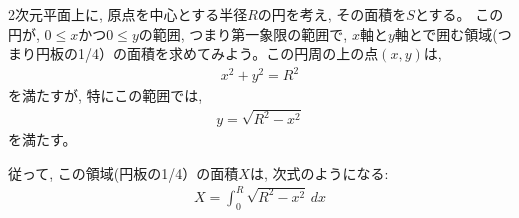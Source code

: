 \begin{exmpl}\label{exmpl:surface2volume_sphere0}
2次元平面上に, 原点を中心とする半径$R$の円を考え, その面積を$S$とする。
この円が, $0\leq x$かつ$0\leq y$の範囲, つまり第一象限の範囲で, 
$x$軸と$y$軸とで囲む領域(つまり円板の1/4）の面積を求めてみよう。この円周の上の点$(x, y)$は,
\begin{eqnarray}x^2+y^2=R^2\end{eqnarray} 
を満たすが, 特にこの範囲では, 
\begin{eqnarray}y=\sqrt{R^2-x^2}\label{eq:circle_positive}\end{eqnarray} 
を満たす。

従って, この領域(円板の1/4）の面積$X$は, 次式のようになる:
\begin{eqnarray}X=\int_{0}^{R}\sqrt{R^2-x^2}\,dx\label{eq:circlearea_strip_int}\end{eqnarray}
\end{exmpl}

